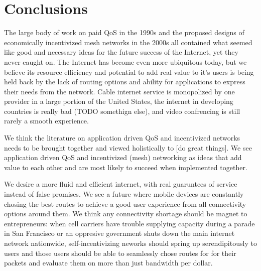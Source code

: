 \section{Conclusions}
The large body of work on paid QoS in the 1990s and the proposed designs of economically incentivized mesh networks in the 2000s all contained what seemed like good and necessary ideas for the future success of the Internet, yet they never caught on.
The Internet has become even more ubiquitous today, but we believe its resource efficiency and potential to add real value to it's users is being held back by the lack of routing options and ability for applications to express their needs from the network.
Cable internet service is monopolized by one provider in a large portion of the United States, the internet in developing countries is really bad (TODO somethign else), and video confrencing is still rarely a smooth experience.

We think the literature on application driven QoS and incentivized networks needs to be brought together and viewed holistically to [do great things]. We see application driven QoS and incentivized (mesh) networking as ideas that add value to each other and are most likely to succeed when implemented together.

We desire a more fluid and efficient internet, with real guaruntees of service instead of false promises. We see a future where mobile devices are constantly chosing the best routes to achieve a good user experience from all connectivity options around them.
We think any connectivity shortage should be magnet to entrepreneurs: when cell carriers have trouble supplying capacity during a parade in San Francisco or an oppresive government shuts down the main internet network nationwide, self-incentivizing neworks should spring up serendipitously to users and those users should be able to seamlessly chose routes for for their packets and evaluate them on more than just bandwidth per dollar.





\label{sec:conc}
